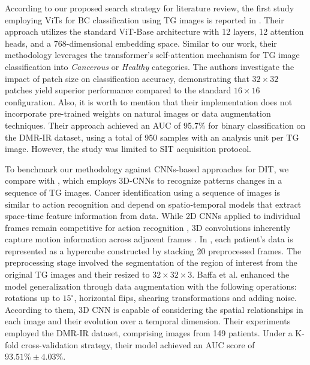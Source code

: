 \documentclass[runningheads]{llncs}
\begin{document}
According to our proposed search strategy for literature review, the
first study employing \ac{ViTs} for \ac{BC} classification using
\ac{TG} images is reported in \cite{Garia2023}. Their approach
utilizes the standard \ac{ViT}-Base architecture with 12 layers, 12
attention heads, and a 768-dimensional embedding
space\cite{dosovitskiy2020image}. Similar to our work, their
methodology leverages the transformer's self-attention mechanism for
\ac{TG} image classification into \textit{Cancerous} or
\textit{Healthy} categories. The authors investigate the impact of
patch size on classification accuracy, demonstrating that
$32 \times 32$ patches yield superior performance compared to the
standard $16 \times 16$ configuration. Also, it is worth to mention
that their implementation does not incorporate pre-trained weights on
natural images or data augmentation techniques. Their approach
achieved an \ac{AUC} of 95.7\% for binary classification on the DMR-IR
dataset\cite{Silva2014}, using a total of 950 samples with an analysis
unit per \ac{TG} image. However, the study was limited to \ac{SIT}
acquisition protocol.

To benchmark our methodology against \ac{CNNs}-based approaches for
\ac{DIT}, we compare with \cite{DeMatheus2023}, which employs
3D-\ac{CNNs} to recognize patterns changes in a sequence of \ac{TG}
images. Cancer identification using a sequence of images is similar to
action recognition and depend on spatio-temporal models that extract
space-time feature information from data. While 2D \ac{CNNs} applied
to individual frames remain competitive for action recognition
\cite{Tran2017}, 3D convolutions inherently capture motion information
across adjacent frames \cite{Ji2013,Qiming2023}. In
\cite{DeMatheus2023}, each patient's data is represented as a
hypercube constructed by stacking 20 preprocessed frames. The
preprocessing stage involved the segmentation of the region of interest
from the original \ac{TG} images and their resized to
$32 \times 32\times 3$. Baffa et al. enhanced the model generalization
through data augmentation with the following operations: rotations up
to $15^\circ$, horizontal flips, shearing transformations and adding
noise. According to them, 3D CNN is capable of considering the spatial
relationships in each image and their evolution over a temporal
dimension. Their experiments employed the DMR-IR dataset, comprising
 images from 149 patients. Under a K-fold
cross-validation strategy, their model achieved an \ac{AUC} score of
\(93.51\% \pm 4.03\%\).
\end{document}
